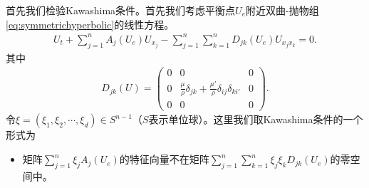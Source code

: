 \documentclass{article}
\begin{document}
首先我们检验Kawashima条件。首先我们考虑平衡点$U_e$附近双曲-抛物组\eqref{eq:symmetrichyperbolic}的线性方程。
\begin{eqnarray}\label{eq:symmtrickawashima}
  U_t + \sum_{j=1}^n A_j(U_e) U_{x_j} -\sum_{j=1}^n \sum_{k=1}^n D_{jk}(U_e) U_{x_j x_k}=  0.
\end{eqnarray}
其中
\begin{eqnarray*}
  D_{jk}(U) = \left( \begin{array}{ccc} 0 & 0 & 0 \\ 0 & \frac{\mu}{\rho} \delta_{jk} + \frac{\mu'}{\rho} \delta_{ij}\delta_{ki'}& 0 \\ 0 & 0 & 0 \end{array} \right).
\end{eqnarray*}
令$\xi=(\xi_1, \xi_2, \cdots, \xi_d)\in S^{n-1}$（$S$表示单位球）。这里我们取Kawashima条件的一个形式为
\begin{itemize}
    \item 矩阵$ \sum_{j=1}^n \xi_j A_j(U_e)$的特征向量不在矩阵$\sum_{j=1}^n \sum_{k=1}^n \xi_j \xi_k D_{jk}(U_e)$的零空间中。
\end{itemize}
\end{document}
